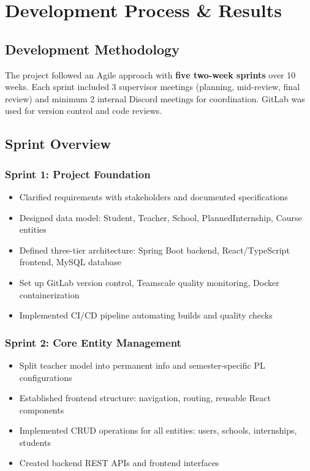 \documentclass[12pt,a4paper]{report}
\begin{document}
\chapter{Development Process \& Results}

\section{Development Methodology}

The project followed an Agile approach with \textbf{five two-week sprints} over 10 weeks. Each sprint included 3 supervisor meetings (planning, mid-review, final review) and minimum 2 internal Discord meetings for coordination. GitLab was used for version control and code reviews.

\section{Sprint Overview}

\subsection{Sprint 1: Project Foundation}
\begin{itemize}
    \item Clarified requirements with stakeholders and documented specifications
    \item Designed data model: Student, Teacher, School, PlannedInternship, Course entities
    \item Defined three-tier architecture: Spring Boot backend, React/TypeScript frontend, MySQL database
    \item Set up GitLab version control, Teamscale quality monitoring, Docker containerization
    \item Implemented CI/CD pipeline automating builds and quality checks
\end{itemize}

\subsection{Sprint 2: Core Entity Management}
\begin{itemize}
    \item Split teacher model into permanent info and semester-specific PL configurations
    \item Established frontend structure: navigation, routing, reusable React components
    \item Implemented CRUD operations for all entities: users, schools, internships, students
    \item Created backend REST APIs and frontend interfaces
\end{itemize}
\end{document}
